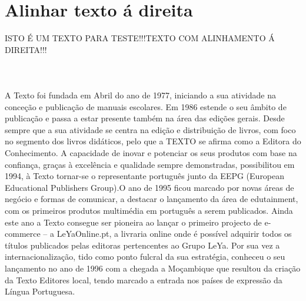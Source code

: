\documentclass[a4paper,11pt]{report}%
\begin{document}
\section{Alinhar texto á direita}
\begin{flushright}
ISTO É UM TEXTO PARA TESTE!!!\newline TEXTO COM ALINHAMENTO Á DIREITA!!!\newline \paragraph{\ \ }
A Texto foi fundada em Abril do ano de 1977, iniciando a sua atividade na conceção e publicação de manuais escolares. Em 1986 estende o seu âmbito de publicação e passa a estar presente também na área das edições gerais. Desde sempre que a sua atividade se centra na edição e distribuição de livros, com foco no segmento dos livros didáticos, pelo que a TEXTO se afirma como a Editora do Conhecimento. A capacidade de inovar e potenciar os seus produtos com base na confiança, graças à excelência e qualidade sempre demonstradas, possibilitou em 1994, à Texto tornar-se o representante português junto da EEPG (European Educational Publishers Group).O ano de 1995 ficou marcado por novas áreas de negócio e formas de comunicar, a destacar o lançamento da área de edutainment, com os primeiros produtos multimédia em português a serem publicados. Ainda este ano a Texto consegue ser pioneira ao lançar o primeiro projecto de e-commerce – a LeYaOnline.pt, a livraria online onde é possível adquirir todos os títulos publicados pelas editoras pertencentes ao Grupo LeYa. Por sua vez a internacionalização, tido como ponto fulcral da sua estratégia, conheceu o seu lançamento no ano de 1996 com a chegada a Moçambique que resultou da criação da Texto Editores local, tendo marcado a entrada nos países de expressão da Língua Portuguesa.
\end{flushright}



\newpage
\end{document}
